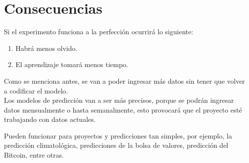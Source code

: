 \section{Consecuencias}

    Si el experimento funciona a la perfección ocurrir\'a lo siguiente:
    \begin{enumerate}
        \item Habrá menos olvido.
        \item El aprendizaje tomará menos tiempo.
    \end{enumerate}

    Como se menciona antes, se van a poder ingresar m\'as datos sin 
    tener que volver a codificar el modelo.\\
    
    Los modelos de predicci\'on van a ser m\'as precisos, porque se podrán ingresar 
    datos mensualmente o hasta semanalmente, esto provocar\'a que el proyecto est\'e trabajando 
    con datos actuales.

    Pueden funcionar para proyectos y predicciones tan simples, por ejemplo, la predicci\'on climatol\'ogica, 
    predicciones de la bolsa de valores, predicci\'on del Bitcoin, entre otras.
